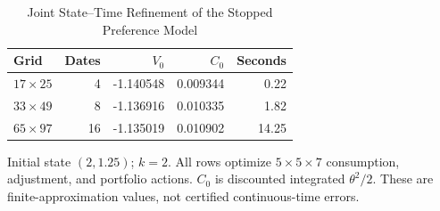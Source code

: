 \begin{table}[tbp]
\centering
\caption{Joint State--Time Refinement of the Stopped Preference Model}
\label{tab:ndu_refine}
\small
\begin{tabular}{@{}lrrrr@{}}
\toprule
Grid & Dates & $V_0$ & $C_0$ & Seconds \\
\midrule
$17\times 25$ & 4 & -1.140548 & 0.009344 & 0.22 \\
$33\times 49$ & 8 & -1.136916 & 0.010335 & 1.82 \\
$65\times 97$ & 16 & -1.135019 & 0.010902 & 14.25 \\
\bottomrule
\end{tabular}
\par\smallskip\begin{minipage}{\linewidth}\footnotesize Initial state $(2,1.25)$; $k=2$. All rows optimize $5\times5\times7$ consumption, adjustment, and portfolio actions. $C_0$ is discounted integrated $\theta^2/2$. These are finite-approximation values, not certified continuous-time errors.\end{minipage}
\end{table}
